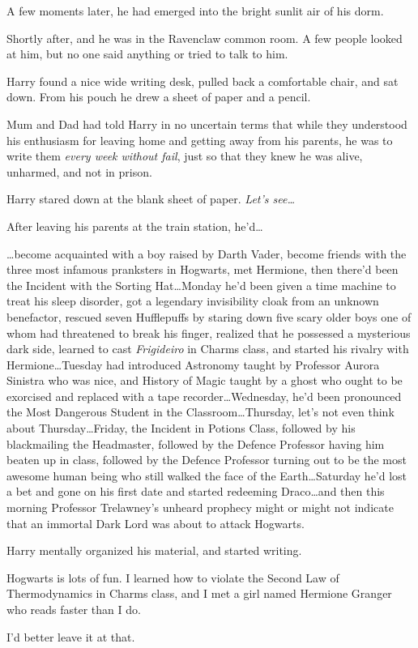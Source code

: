 A few moments later, he had emerged into the bright sunlit air of his dorm.

Shortly after, and he was in the Ravenclaw common room. A few people looked at him, but no one said anything or tried to talk to him.

Harry found a nice wide writing desk, pulled back a comfortable chair, and sat down. From his pouch he drew a sheet of paper and a pencil.

Mum and Dad had told Harry in no uncertain terms that while they understood his enthusiasm for leaving home and getting away from his parents, he was to write them \emph{every week without fail}, just so that they knew he was alive, unharmed, and not in prison.

Harry stared down at the blank sheet of paper. \emph{Let’s see…}

After leaving his parents at the train station, he’d…

…become acquainted with a boy raised by Darth Vader, become friends with the three most infamous pranksters in Hogwarts, met Hermione, then there’d been the Incident with the Sorting Hat…Monday he’d been given a time machine to treat his sleep disorder, got a legendary invisibility cloak from an unknown benefactor, rescued seven Hufflepuffs by staring down five scary older boys one of whom had threatened to break his finger, realized that he possessed a mysterious dark side, learned to cast \emph{Frigideiro} in Charms class, and started his rivalry with Hermione…Tuesday had introduced Astronomy taught by Professor Aurora Sinistra who was nice, and History of Magic taught by a ghost who ought to be exorcised and replaced with a tape recorder…Wednesday, he’d been pronounced the Most Dangerous Student in the Classroom…Thursday, let’s not even think about Thursday…Friday, the Incident in Potions Class, followed by his blackmailing the Headmaster, followed by the Defence Professor having him beaten up in class, followed by the Defence Professor turning out to be the most awesome human being who still walked the face of the Earth…Saturday he’d lost a bet and gone on his first date and started redeeming Draco…and then this morning Professor Trelawney’s unheard prophecy might or might not indicate that an immortal Dark Lord was about to attack Hogwarts.

Harry mentally organized his material, and started writing.

\begin{writtenNote}

Hogwarts is lots of fun. I learned how to violate the Second Law of Thermodynamics in Charms class, and I met a girl named Hermione Granger who reads faster than I do.

I’d better leave it at that.

 \end{writtenNote}
